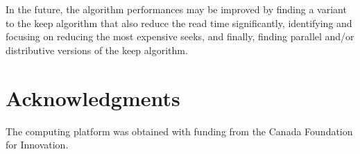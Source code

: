 \documentclass[sigconf, nonacm]{acmart}
\begin{document}
In the future, the algorithm performances may be improved by finding a variant
to the keep algorithm that also reduce the read time significantly,
identifying and focusing on reducing the most expensive seeks,
and finally, finding parallel and/or distributive versions of the keep algorithm.

\section{Acknowledgments}

The computing platform was obtained with funding from the Canada Foundation for Innovation.



\end{document}
